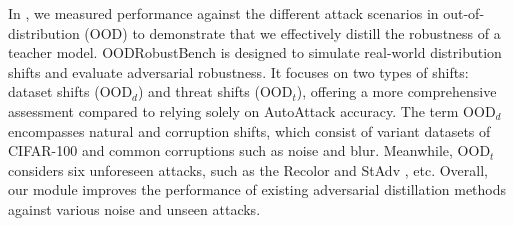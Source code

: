 \documentclass{article} %
\begin{document}
In , we measured performance against the different attack scenarios in out-of-distribution (OOD) to demonstrate that we effectively distill the robustness of a teacher model.
OODRobustBench \citep{li2023oodrobustbench} is designed to simulate real-world distribution shifts and evaluate adversarial robustness. It focuses on two types of shifts: dataset shifts ($\text{OOD}_{d}$) and threat shifts ($\text{OOD}_{t}$), offering a more comprehensive assessment compared to relying solely on AutoAttack accuracy.
The term $\text{OOD}_{d}$ encompasses natural and corruption shifts, which consist of variant datasets of CIFAR-100 and common corruptions such as noise and blur.
Meanwhile, $\text{OOD}_{t}$ considers six unforeseen attacks, such as the Recolor \citep{recolor} and StAdv \citep{stAdv_2018}, etc.
Overall, our module improves the performance of existing adversarial distillation methods against various noise and unseen attacks.
\end{document}
